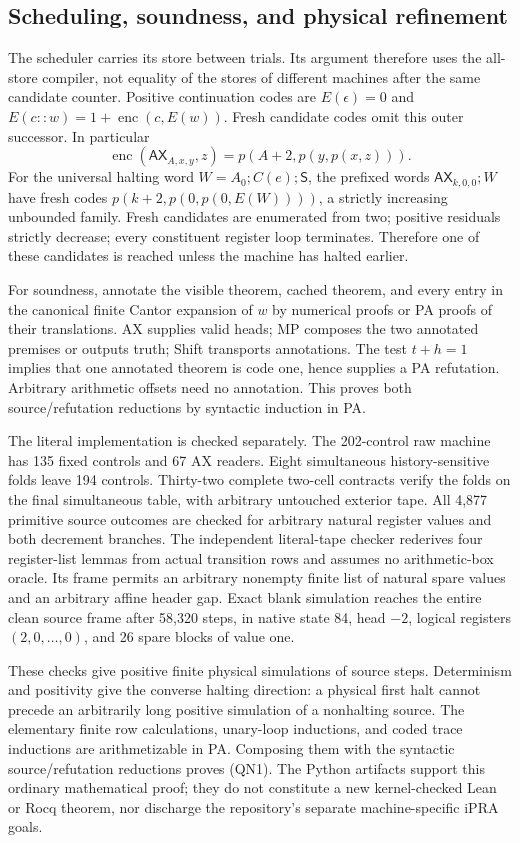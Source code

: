 \subsection{Scheduling, soundness, and physical refinement}

The scheduler carries its store between trials. Its argument therefore
uses the all-store compiler, not equality of the stores of different
machines after the same candidate counter. Positive continuation codes
are $E(\epsilon)=0$ and
$E(c::w)=1+\operatorname{enc}(c,E(w))$. Fresh candidate codes omit this
outer successor. In particular
\[
 \operatorname{enc}(\mathsf{AX}_{A,x,y},z)
       =p(A+2,p(y,p(x,z))).
\]
For the universal halting word $W=A_0;C(e);\mathsf S$, the prefixed
words $\mathsf{AX}_{k,0,0};W$ have fresh codes
$p(k+2,p(0,p(0,E(W))))$, a strictly increasing unbounded family.
Fresh candidates are enumerated from two; positive residuals strictly
decrease; every constituent register loop terminates. Therefore one of
these candidates is reached unless the machine has halted earlier.

For soundness, annotate the visible theorem, cached theorem, and every
entry in the canonical finite Cantor expansion of $w$ by numerical proofs
or PA proofs of their translations. AX supplies valid heads; MP composes
the two annotated premises or outputs truth; Shift transports annotations.
The test $t+h=1$ implies that one annotated theorem is code one, hence
supplies a PA refutation. Arbitrary arithmetic offsets need no annotation.
This proves both source/refutation reductions by syntactic induction in PA.

The literal implementation is checked separately. The 202-control raw
machine has 135 fixed controls and 67 AX readers. Eight simultaneous
history-sensitive folds leave 194 controls. Thirty-two complete two-cell
contracts verify the folds on the final simultaneous table, with arbitrary
untouched exterior tape. All 4,877 primitive source outcomes are checked
for arbitrary natural register values and both decrement branches.
The independent literal-tape checker rederives four register-list lemmas
from actual transition rows and assumes no arithmetic-box oracle.
Its frame permits an arbitrary nonempty finite list of natural spare values
and an arbitrary affine header gap. Exact blank simulation reaches the
entire clean source frame after 58,320 steps, in native state 84, head
$-2$, logical registers $(2,0,\ldots,0)$, and 26 spare blocks of value one.

These checks give positive finite physical simulations of source steps.
Determinism and positivity give the converse halting direction: a physical
first halt cannot precede an arbitrarily long positive simulation of a
nonhalting source. The elementary finite row calculations, unary-loop
inductions, and coded trace inductions are arithmetizable in PA.
Composing them with the syntactic source/refutation reductions proves (QN1).
The Python artifacts support this ordinary mathematical proof; they do not
constitute a new kernel-checked Lean or Rocq theorem, nor discharge the
repository's separate machine-specific iPRA goals.
